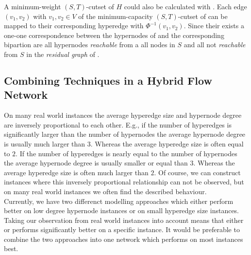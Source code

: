 A minimum-weight $(S,T)$-cutset of $H$ could also be calculated with . 
Each edge $(v_1,v_2)$ with $v_1,v_2 \in V$ of the minimum-capacity
$(S,T)$-cutset of  can be mapped to their corresponding hyperedge
with $\Phi^{-1}(v_1,v_2)$. Since their exists a one-one correspondence between the hypernodes
of  and  the corresponding bipartion are all hypernodes \emph{reachable}
from a all nodes in $S$ and all not \emph{reachable} from $S$ in the \emph{residual graph}
of . 

\subsection{Combining Techniques in a Hybrid Flow Network}
\label{sec:hybrid_network}

On many real world instances the average hyperedge size and hypernode degree are inversely
proportional to each other. E.g., if the number of hyperedges is significantly larger than the
number of hypernodes the average hypernode degree is usually much larger than $3$. Whereas
the average hyperedge size is often equal to $2$. If the number of hyperedges is nearly equal
to the number of hypernodes the average hypernode degree is usually smaller or equal than $3$. Whereas
the average hyperedge size is often much larger than $2$. Of course, we can construct instances
where this inversely proportional relationship can not be observed, but on many real world instances
we often find the described behaviour. \\
Currently, we have two differenct modelling approaches which either perform better on low degree
hypernode instances or on small hyperedge size instances. Taking our observation from real world instances 
into account means that either  or  performs significantly better on
a specific instance. It would be preferable to combine the two approaches into one network 
which performs on most instances best. \\

